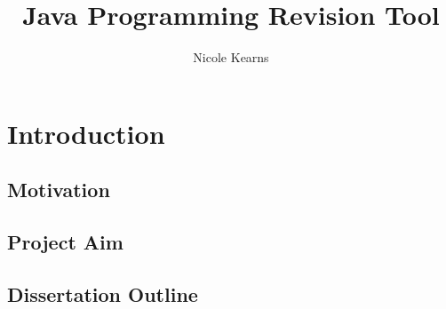 \documentclass{article}
\begin{document}
\title{Java Programming Revision Tool}
\author{Nicole Kearns}
\maketitle
\tableofcontents

\section{Introduction}

\subsection{Motivation}

\subsection{Project Aim}

\subsection{Dissertation Outline}
\end{document}
